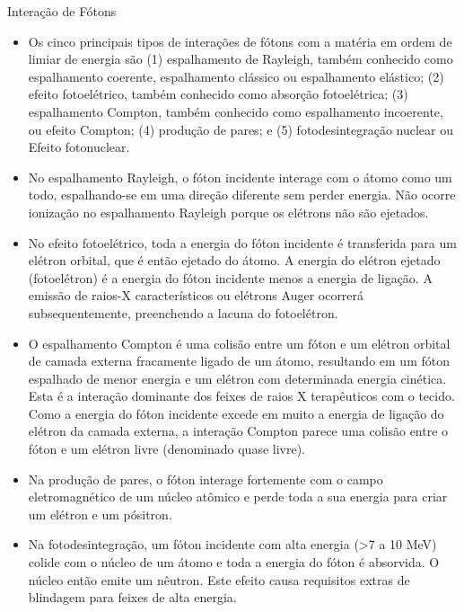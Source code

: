 \documentclass[11pt,a4paper]{article}
\newcounter{exemplo}
\begin{document}
\begin{exemplo}
    \textcolor{CarnationPink}{Interação de Fótons}
    \begin{itemize}
        \item Os cinco principais tipos de interações de fótons com a matéria em ordem de limiar de energia são (1) espalhamento de Rayleigh, também conhecido como espalhamento coerente, espalhamento clássico ou espalhamento elástico; (2) efeito fotoelétrico, também conhecido como absorção fotoelétrica; (3) espalhamento Compton, também conhecido como espalhamento incoerente, ou efeito Compton; (4) produção de pares; e (5) fotodesintegração nuclear ou Efeito fotonuclear.
        
        \item No espalhamento Rayleigh, o fóton incidente interage com o átomo como um todo, espalhando-se em uma direção diferente sem perder energia. Não ocorre ionização no espalhamento Rayleigh porque os elétrons não são ejetados.
        
        \item No efeito fotoelétrico, toda a energia do fóton incidente é transferida para um elétron orbital, que é então ejetado do átomo. A energia do elétron ejetado (fotoelétron) é a energia do fóton incidente menos a energia de ligação. A emissão de raios-X característicos ou elétrons Auger ocorrerá subsequentemente, preenchendo a lacuna do fotoelétron.
        
        \item O espalhamento Compton é uma colisão entre um fóton e um elétron orbital de camada externa fracamente ligado de um átomo, resultando em um fóton espalhado de menor energia e um elétron com determinada energia cinética. Esta é a interação dominante dos feixes de raios X terapêuticos com o tecido. Como a energia do fóton incidente excede em muito a energia de ligação do elétron da camada externa, a interação Compton parece uma colisão entre o fóton e um elétron livre (denominado quase livre).
        
        \item Na produção de pares, o fóton interage fortemente com o campo eletromagnético de um núcleo atômico e perde toda a sua energia para criar um elétron e um pósitron.
        
        \item Na fotodesintegração, um fóton incidente com alta energia (>7 a 10 MeV) colide com o núcleo de um átomo e toda a energia do fóton é absorvida. O núcleo então emite um nêutron. Este efeito causa requisitos extras de blindagem para feixes de alta energia.
        

\end{itemize}
\end{exemplo}
\end{document}
